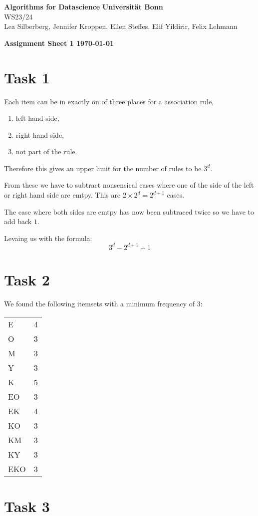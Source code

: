 \documentclass[DIN, pagenumber=false, fontsize=11pt, parskip=half]{scrartcl}
\renewcommand{\title}[1]{{\noindent\Large\textbf{#1}}}
\begin{document}
\noindent\textbf{Algorithms for Datascience} \hfill \textbf{Universität Bonn}\\
WS23/24 \hfill \\
Lea Silberberg, Jennifer Kroppen, Ellen Steffes, Elif Yildirir, Felix Lehmann

\title{Assignment Sheet 1 \hfill \today}

\section*{Task 1}

Each item can be in exactly on of three places for a association rule,
\begin{enumerate}
    \item left hand side,
    \item right hand side,
    \item not part of the rule.
\end{enumerate}

Therefore this gives an upper limit for the number of rules to be $3^d$.

From these we have to subtract nonsensical cases where one of the side of the left or right hand side are emtpy.
This are $2 \times 2^d = 2^{d+1}$ cases.

The case where both sides are emtpy has now been subtraced twice so we have to add back $1$.

Levaing us with the formula:
\begin{equation*}
    3^d - 2^{d+1} + 1
\end{equation*}

\section*{Task 2}

We found the following itemsets with a minimum frequency of $3$:\\
\begin{table}[h!]
    \begin{tabular}{ll}
        E   & 4 \\
        O   & 3 \\
        M   & 3 \\
        Y   & 3 \\
        K   & 5 \\
        EO  & 3 \\
        EK  & 4 \\
        KO  & 3 \\
        KM  & 3 \\
        KY  & 3 \\
        EKO & 3
    \end{tabular}
\end{table}


\section*{Task 3}
\end{document}
